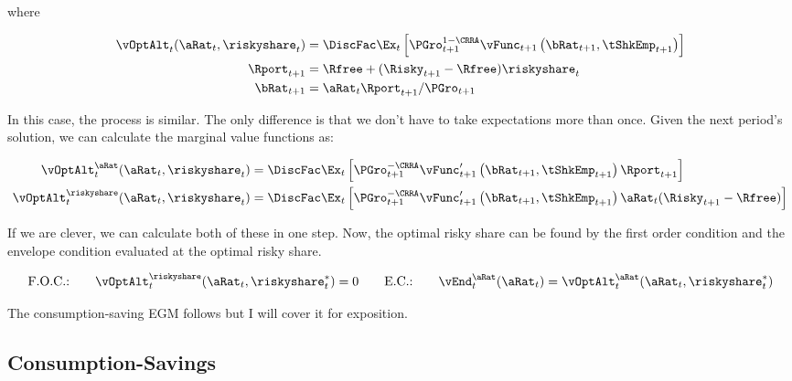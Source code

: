 \documentclass[\econtexRoot/SequentialEGM]{subfiles}
\begin{document}
where

\begin{equation}
        \begin{split}
                \vOptAlt_{t}(\aRat_{t}, \riskyshare_{t}) & = \DiscFac \Ex_{t} \left[ \PGro_{t+1}^{1-\CRRA} \vFunc_{t+1}\left(\bRat_{t+1}, \tShkEmp_{t+1}\right)   \right] \\
                \Rport_{t+1} & = \Rfree + (\Risky_{t+1} - \Rfree) \riskyshare_{t} \\
                \bRat_{t+1} & = \aRat_{t} \Rport_{t+1} / \PGro_{t+1}
        \end{split}
\end{equation}

In this case, the process is similar. The only difference is that we don't have to take expectations more than once. Given the next period's solution, we can calculate the marginal value functions as:

\begin{equation}
        \begin{split}
                \vOptAlt_{t}^{\aRat}(\aRat_{t}, \riskyshare_{t}) & = \DiscFac \Ex_{t} \left[ \PGro_{t+1}^{-\CRRA} \vFunc_{t+1}'\left(\bRat_{t+1}, \tShkEmp_{t+1}\right) \Rport_{t+1}   \right] \\
                \vOptAlt_{t}^{\riskyshare}(\aRat_{t}, \riskyshare_{t}) & = \DiscFac \Ex_{t} \left[ \PGro_{t+1}^{-\CRRA} \vFunc_{t+1}'\left(\bRat_{t+1}, \tShkEmp_{t+1}\right) \aRat_{t} (\Risky_{t+1} - \Rfree)   \right] \\
        \end{split}
\end{equation}

If we are clever, we can calculate both of these in one step. Now, the optimal risky share can be found by the first order condition and the envelope condition evaluated at the optimal risky share.

\begin{equation}
        \text{F.O.C.:} \qquad \vOptAlt_{t}^{\riskyshare}(\aRat_{t}, \riskyshare_{t}^{*})  = 0 \qquad
        \text{E.C.:} \qquad \vEnd_{t}^{\aRat}(\aRat_{t}) = \vOptAlt_{t}^{\aRat}(\aRat_{t}, \riskyshare_{t}^{*})
\end{equation}

The consumption-saving EGM follows \cite{Carroll2006-wq} but I will cover it for exposition.

\subsection{Consumption-Savings}
\end{document}
